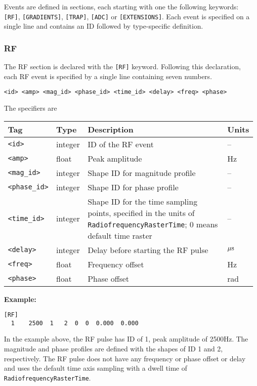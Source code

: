 \documentclass{article}
\begin{document}
Events are defined in sections, each starting with one the following keywords: \verb.[RF]., \verb.[GRADIENTS]., \verb.[TRAP]., \verb.[ADC]. or \verb.[EXTENSIONS].. Each event is specified on a single line and contains an ID followed by type-specific definition.

\subsubsection{RF}
The RF section is declared with the \verb.[RF]. keyword. Following this declaration, each RF event is specified by a single line containing seven numbers.
\begin{lstlisting}
<id> <amp> <mag_id> <phase_id> <time_id> <delay> <freq> <phase>
\end{lstlisting}

The specifiers are

\begin{tabularx}{\textwidth}{llXl}
\toprule
Tag & Type & Description & Units\\
\midrule
\verb.<id>. & integer & ID of the RF event & -- \\
\verb.<amp>. & float & Peak amplitude & Hz \\
\verb.<mag_id>. & integer & Shape ID for magnitude profile & -- \\
\verb.<phase_id>. & integer & Shape ID for phase profile & --\\
\verb.<time_id>. & integer & Shape ID for the time sampling points, specified in the units of \verb.RadiofrequencyRasterTime.; 0 means default time raster & -- \\
\verb.<delay>. & integer & Delay before starting the RF pulse & $\rm \mu s$\\
\verb.<freq>. & float & Frequency offset & Hz \\
\verb.<phase>. & float & Phase offset & rad \\
\bottomrule
\end{tabularx}

\begin{minipage}{\textwidth}
\textbf{Example:}
\begin{lstlisting}
[RF]
  1    2500  1   2  0  0  0.000  0.000
\end{lstlisting}
\end{minipage}

In the example above, the RF pulse has ID of 1, peak amplitude of 2500Hz. The magnitude and phase profiles are defined with the shapes of ID 1 and 2, respectively. The RF pulse does not have any frequency or phase offset or delay and uses the default time axis sampling with a dwell time of \verb.RadiofrequencyRasterTime..
\end{document}
